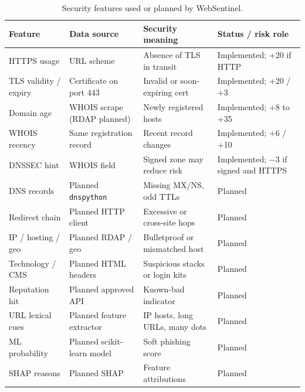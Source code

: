\begin{table}[!t]
\centering
\caption{Security features used or planned by WebSentinel.}
\label{tab:features}
\begin{tabular}{p{3.2cm}p{3.4cm}p{4.4cm}p{3.4cm}}
\toprule
Feature & Data source & Security meaning & Status / risk role \\
\midrule
HTTPS usage & URL scheme & Absence of TLS in transit & Implemented; +20 if HTTP \\
TLS validity / expiry & Certificate on port 443 & Invalid or soon-expiring cert & Implemented; +20 / +3 \\
Domain age & WHOIS scrape (RDAP planned) & Newly registered hosts & Implemented; +8 to +35 \\
WHOIS recency & Same registration record & Recent record changes & Implemented; +6 / +10 \\
DNSSEC hint & WHOIS field & Signed zone may reduce risk & Implemented; $-3$ if signed and HTTPS \\
DNS records & Planned \texttt{dnspython} & Missing MX/NS, odd TTLs & Planned \\
Redirect chain & Planned HTTP client & Excessive or cross-site hops & Planned \\
IP / hosting / geo & Planned RDAP / geo & Bulletproof or mismatched host & Planned \\
Technology / CMS & Planned HTML headers & Suspicious stacks or login kits & Planned \\
Reputation hit & Planned approved API & Known-bad indicator & Planned \\
URL lexical cues & Planned feature extractor & IP hosts, long URLs, many dots & Planned \\
ML probability & Planned scikit-learn model & Soft phishing score & Planned \\
SHAP reasons & Planned SHAP & Feature attributions & Planned \\
\bottomrule
\end{tabular}
\end{table}

